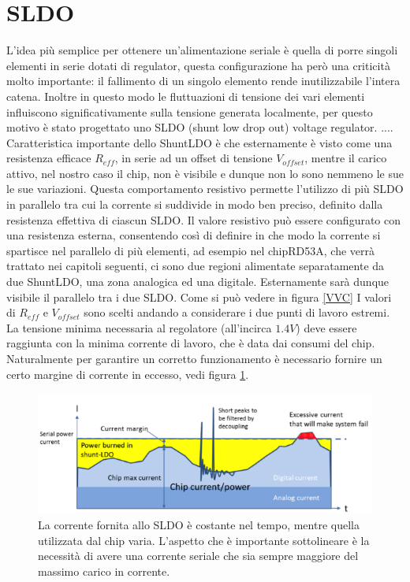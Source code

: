 \section{SLDO}
L'idea più semplice per ottenere un'alimentazione seriale è quella di porre singoli elementi in serie dotati di regulator, questa configurazione ha però una criticità molto importante: il fallimento di un singolo elemento rende inutilizzabile l'intera catena. 
Inoltre in questo modo le fluttuazioni di tensione dei vari elementi influiscono significativamente  sulla tensione generata localmente, per questo motivo è stato progettato uno SLDO (shunt low drop out) voltage regulator.
....
% 
Caratteristica importante dello ShuntLDO è che esternamente è visto come una resistenza efficace $R_{eff}$, in serie ad un offset di tensione $V_{offset}$, mentre il carico attivo, nel nostro caso il chip, non è visibile e dunque non lo sono nemmeno le sue le sue variazioni. 
Questa comportamento resistivo permette l'utilizzo di più SLDO in parallelo tra cui la corrente si suddivide in modo ben preciso, definito dalla resistenza effettiva di ciascun SLDO. Il valore resistivo può essere configurato con una resistenza esterna, consentendo così di definire in che modo la corrente si spartisce nel parallelo di più elementi, ad esempio nel chipRD53A, che verrà trattato nei capitoli seguenti, ci sono due regioni alimentate separatamente da due ShuntLDO, una zona analogica ed una digitale. Esternamente sarà dunque visibile il parallelo tra i due SLDO. Come si può vedere in figura \ref{VVC} I valori di $R_{eff}$ e $V_{offset}$ sono scelti andando a considerare i due punti di lavoro estremi. La tensione minima necessaria al regolatore (all'incirca $1.4V$) deve essere raggiunta con la minima corrente di lavoro, che è data dai consumi del chip. Naturalmente per garantire un corretto funzionamento è necessario fornire un certo margine di corrente in eccesso, vedi figura \ref{SLDOprinciple}. 
\begin{figure}
\centering
\includegraphics[scale=.5]{Immagini/ShuntRegulatorPrinciple}
\caption{La corrente fornita allo SLDO è costante nel tempo, mentre quella utilizzata dal chip varia. L'aspetto che è importante sottolineare è la necessità di avere una corrente seriale che sia sempre maggiore del massimo carico in corrente.}
\label{SLDOprinciple}
\end{figure}
